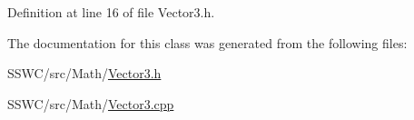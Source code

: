 Definition at line 16 of file Vector3.\+h.



The documentation for this class was generated from the following files\+:\begin{DoxyCompactItemize}
\item 
S\+S\+W\+C/src/\+Math/\hyperlink{_vector3_8h}{Vector3.\+h}\item 
S\+S\+W\+C/src/\+Math/\hyperlink{_vector3_8cpp}{Vector3.\+cpp}\end{DoxyCompactItemize}
